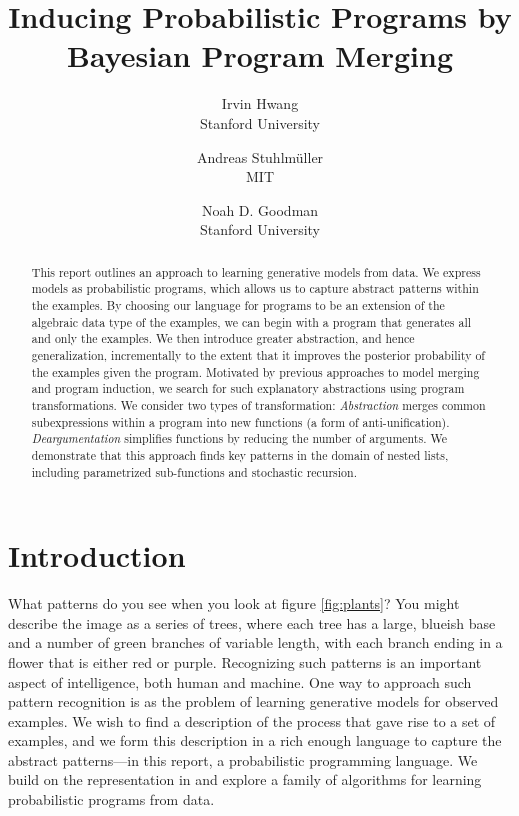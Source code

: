 \documentclass[a4paper,10pt]{article}
\begin{document}
\title{\vspace{-1.7cm}Inducing Probabilistic Programs by Bayesian Program Merging}
\author{Irvin Hwang\\Stanford University  \and Andreas Stuhlm\"{u}ller\\MIT \and Noah D. Goodman\\Stanford University}
\date{}
\maketitle
\thispagestyle{empty}
\begin{abstract}

This report outlines an approach to learning generative models from data. We express models as probabilistic programs, which allows us to capture abstract patterns within the examples. By choosing our language for programs to be an extension of the algebraic data type of the examples, we can begin with a program that generates all and only the examples. We then introduce greater abstraction, and hence generalization, incrementally to the extent that it improves the posterior probability of the examples given the program. Motivated by previous approaches to model merging and program induction, we search for such explanatory abstractions using program transformations. We consider two types of transformation: {\em Abstraction} merges common subexpressions within a program into new functions (a form of anti-unification). {\em Deargumentation} simplifies functions by reducing the number of arguments. We demonstrate that this approach finds key patterns in the domain of nested lists, including parametrized sub-functions and stochastic recursion.

\end{abstract}

\tableofcontents

\section{Introduction}

What patterns do you see when you look at figure \ref{fig:plants}? You might describe the image as a series of trees, where each tree has a large, blueish base and a number of green branches of variable length, with each branch ending in a flower that is either red or purple. Recognizing such patterns is an important aspect of intelligence, both human and machine.
One way to approach such pattern recognition is as the problem of learning generative models for observed examples. We wish to find a description of the process that gave rise to a set of examples, and we form this description in a rich enough language to capture the abstract patterns---in this report, a probabilistic programming language. 
We build on the representation in \cite{A.Stuhlmueller:2010:6d11a} and explore a family of algorithms for learning probabilistic programs from data.
\end{document}
